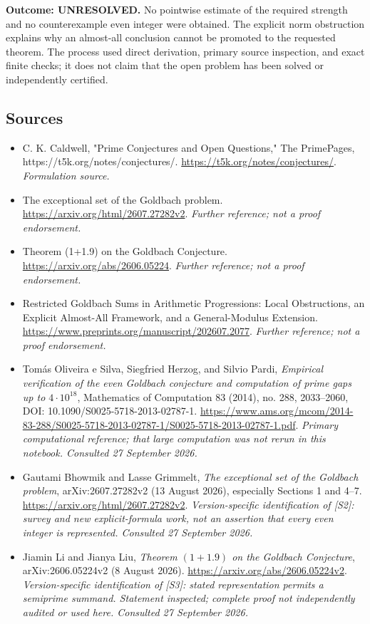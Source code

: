 \documentclass[11pt]{article}
\begin{document}
\textbf{Outcome: UNRESOLVED.} No pointwise estimate of the required
strength and no counterexample even integer were obtained. The explicit
norm obstruction explains why an almost-all conclusion cannot be promoted
to the requested theorem. The process used direct derivation, primary
source inspection, and exact finite checks; it does not claim that the
open problem has been solved or independently certified.

\subsection{Sources}
\begin{itemize}
\item[S1]C. K. Caldwell, "Prime Conjectures and Open Questions," The PrimePages, https://t5k.org/notes/conjectures/.
\url{https://t5k.org/notes/conjectures/}.
\textit{Formulation source.}
\item[S2]The exceptional set of the Goldbach problem.
\url{https://arxiv.org/html/2607.27282v2}.
\textit{Further reference; not a proof endorsement.}
\item[S3]Theorem (1+1.9) on the Goldbach Conjecture.
\url{https://arxiv.org/abs/2606.05224}.
\textit{Further reference; not a proof endorsement.}
\item[S4]Restricted Goldbach Sums in Arithmetic Progressions: Local Obstructions, an Explicit Almost-All Framework, and a General-Modulus Extension.
\url{https://www.preprints.org/manuscript/202607.2077}.
\textit{Further reference; not a proof endorsement.}

\item[E1]Tom\'as Oliveira e Silva, Siegfried Herzog, and Silvio Pardi,
\emph{Empirical verification of the even Goldbach conjecture and computation
of prime gaps up to $4\cdot10^{18}$}, Mathematics of Computation 83
(2014), no. 288, 2033--2060, DOI: 10.1090/S0025-5718-2013-02787-1.
\url{https://www.ams.org/mcom/2014-83-288/S0025-5718-2013-02787-1/S0025-5718-2013-02787-1.pdf}.
\textit{Primary computational reference; that large computation was not
rerun in this notebook. Consulted 27 September 2026.}
\item[E2]Gautami Bhowmik and Lasse Grimmelt,
\emph{The exceptional set of the Goldbach problem},
arXiv:2607.27282v2 (13 August 2026), especially Sections 1 and 4--7.
\url{https://arxiv.org/html/2607.27282v2}.
\textit{Version-specific identification of [S2]: survey and new explicit-formula
work, not an assertion that every even integer is represented.
Consulted 27 September 2026.}
\item[E3]Jiamin Li and Jianya Liu,
\emph{Theorem $(1+1.9)$ on the Goldbach Conjecture},
arXiv:2606.05224v2 (8 August 2026).
\url{https://arxiv.org/abs/2606.05224v2}.
\textit{Version-specific identification of [S3]: stated representation permits
a semiprime summand. Statement inspected; complete proof not independently
audited or used here. Consulted 27 September 2026.}
\end{itemize}
\end{document}
